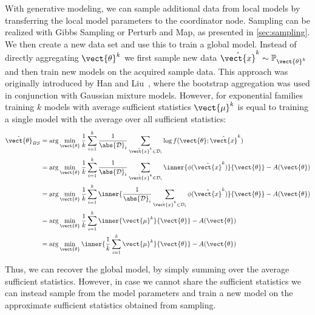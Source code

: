 With generative modeling, we can sample additional data from local models by transferring the local model parameters to the coordinator node.
Sampling can be realized with Gibbs Sampling or Perturb and Map, as presented in \autoref{sec:sampling}.
We then create a new data set and use this to train a  global model. 
Instead of directly aggregating $\vect{\theta}^k$ we first sample new data  $\hat{\vect{x}}^k \sim \mathbb{P}_{\vect{\theta}^k}$ and then train new models on the acquired sample data.
This approach was originally introduced by Han and Liu~\cite{han2016bootstrap}, where the bootstrap aggregation was used in conjunction with Gaussian mixture models.
However, for exponential families training $k$ models with average sufficient statistics $\vect{\mu}^k$ is equal to training a single model with the average over all sufficient statistics:
\begin{equation}
    \begin{split}
        \tilde{\vect{\theta}}_{BS} &= \arg\min_{\vect{\theta}} \frac{1}{k}\sum_{i=1}^k \frac{1}{\abs{\mathcal{D}}_i} \sum_{\hat{\vect{x}}^k \in \mathcal{D}_i} \log f(\vect{\theta}; \hat{\vect{x}}^k) \\
        &=  \arg\min_{\vect{\theta}} \frac{1}{k}\sum_{i=1}^k \frac{1}{\abs{\mathcal{D}}_i} \sum_{\hat{\vect{x}}^k \in \mathcal{D}_i} \inner{\phi(\hat{\vect{x}}^k)}{\vect{\theta}} - A(\vect{\theta}) \\
        &= \arg\min_{\vect{\theta}} \frac{1}{k}\sum_{i=1}^k \inner{\frac{1}{\abs{\mathcal{D}}_i} \sum_{\hat{\vect{x}}^k \in \mathcal{D}_i} \phi(\hat{\vect{x}}^k)}{\vect{\theta}} - A(\vect{\theta}) \\
        &= \arg\min_{\vect{\theta}} \frac{1}{k}\sum_{i=1}^k \inner{\vect{\mu}^k}{\vect{\theta}} - A(\vect{\theta}) \\
        & =  \arg\min_{\vect{\theta}} \inner{\frac{1}{k}\sum_{i=1}^k  \vect{\mu}^k}{\vect{\theta}} - A(\vect{\theta})
    \end{split}
\end{equation}

Thus, we can recover the global model, by simply summing over the average sufficient statistics.
However, in case we cannot share the sufficient statistics we can instead sample from the model parameters and train a new model on the approximate sufficient statistics obtained from sampling.


